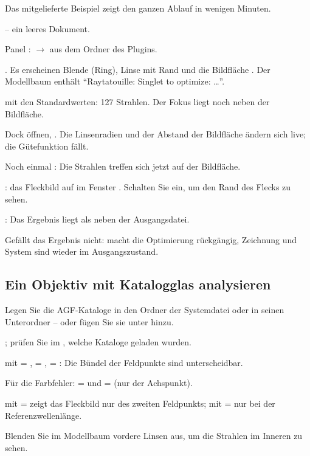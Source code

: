 Das mitgelieferte Beispiel zeigt den ganzen Ablauf in wenigen Minuten.

\begin{schritte}
  \item {} -- ein leeres Dokument.
  \item Panel :  $\to$
     aus dem Ordner des Plugins.
  \item {}. Es erscheinen Blende (Ring), Linse  mit Rand und die
    Bildfläche . Der Modellbaum enthält \enquote{Raytatouille: Singlet to optimize: …}.
  \item {} mit den Standardwerten: 127 Strahlen. Der Fokus liegt noch neben der
    Bildfläche.
  \item Dock  öffnen, . Die Linsenradien und der Abstand der Bildfläche
    ändern sich live; die Gütefunktion fällt.
  \item Noch einmal : Die Strahlen treffen sich jetzt auf der Bildfläche.
  \item {}: das Fleckbild auf  im Fenster . Schalten Sie
     ein, um den Rand des Flecks zu sehen.
  \item {}: Das Ergebnis liegt als  neben
    der Ausgangsdatei.
  \item Gefällt das Ergebnis nicht:  macht die Optimierung rückgängig, Zeichnung und
    System sind wieder im Ausgangszustand.
\end{schritte}

\subsection{Ein Objektiv mit Katalogglas analysieren}

\begin{schritte}
  \item Legen Sie die AGF-Kataloge in den Ordner der Systemdatei oder in seinen Unterordner
     -- oder fügen Sie sie unter  hinzu.
  \item {}; prüfen Sie im , welche Kataloge geladen wurden.
  \item {} mit  = ,  = ,
     = : Die Bündel der Feldpunkte sind unterscheidbar.
  \item Für die Farbfehler:  =  und  = 
    (nur der Achspunkt).
  \item {} mit  =  zeigt das Fleckbild nur des zweiten
    Feldpunkts; mit  =  nur bei der Referenzwellenlänge.
  \item Blenden Sie im Modellbaum vordere Linsen aus, um die Strahlen im Inneren zu sehen.
\end{schritte}


